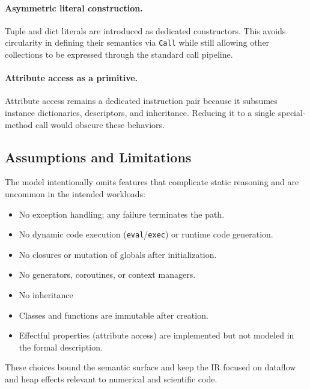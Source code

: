 \paragraph{Asymmetric literal construction.}
Tuple and dict literals are introduced as dedicated constructors. This avoids circularity in defining their semantics via \texttt{Call} while still allowing other collections to be expressed through the standard call pipeline.

\paragraph{Attribute access as a primitive.}
Attribute access remains a dedicated instruction pair because it subsumes instance dictionaries, descriptors, and inheritance. Reducing it to a single special-method call would obscure these behaviors.

\subsection{Assumptions and Limitations}

The model intentionally omits features that complicate static reasoning and are uncommon in the intended workloads:
\begin{itemize}
\item No exception handling; any failure terminates the path.
\item No dynamic code execution (\texttt{eval}/\texttt{exec}) or runtime code generation.
\item No closures or mutation of globals after initialization.
\item No generators, coroutines, or context managers.
\item No inheritance
\item Classes and functions are immutable after creation.
\item Effectful properties (attribute access) are implemented but not modeled in the formal description.
\end{itemize}
These choices bound the semantic surface and keep the IR focused on dataflow and heap effects relevant to numerical and scientific code.

\clearpage
